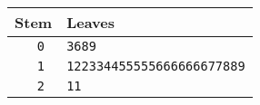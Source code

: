 \begin{tabular}{r|l}
  Stem  & Leaves\\
  \hline
  \tt 0 & \tt 3689\\
  \tt 1 & \tt 122334455555666666677889\\
  \tt 2 & \tt 11\\
\end{tabular}